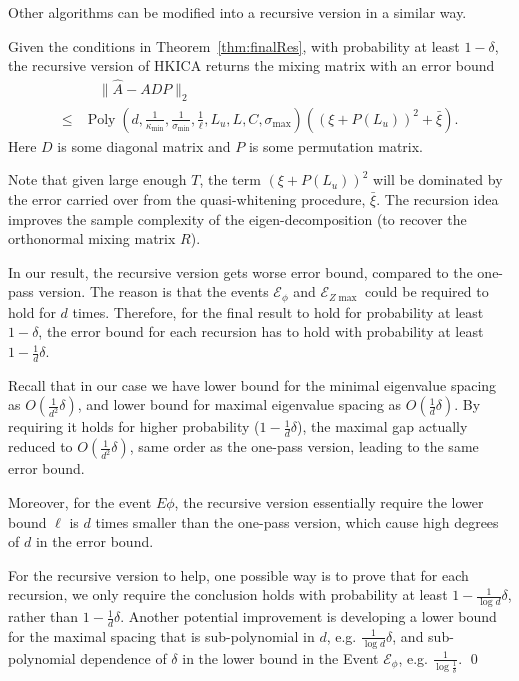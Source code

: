 \documentclass[twoside,11pt]{article}
\newcommand{\Ephi}{\mathcal{E}_{\phi}}
\newcommand{\Ez}{\mathcal{E}_{Z\max}}
\DeclareMathOperator{\pol}{Poly}
\newcommand{\poly}[1]{\pol\left(#1\right)}
\begin{document}
\begin{remark}
Other algorithms can be modified into a recursive version in a similar way. 
\end{remark}
\begin{theorem}
\label{thm:recursiveAlg}
Given the conditions in Theorem~\ref{thm:finalRes}, with probability at least $1-\delta$, the recursive version of HKICA returns the mixing matrix with an error bound
\begin{align*}
& \quad \| \hat{A} - ADP\|_2 \\
\le & \poly{d,\frac{1}{\kappa_{\min}}, \frac{1}{\sigma_{\min}}, \frac{1}{\ell}, L_u, L, C, \sigma_{\max}}((\xi + P(L_u))^2 + \bar{\xi}).
\end{align*}
Here $D$ is some diagonal matrix and $P$ is some permutation matrix.
\end{theorem} 
\begin{remark}
Note that given large enough $T$, the term $(\xi + P(L_u))^2$ will be dominated by the error carried over from the quasi-whitening procedure, $\bar{\xi}$.
The recursion idea improves the sample complexity of the eigen-decomposition (to recover the orthonormal mixing matrix $R$).  
\end{remark}

\begin{remark}
In our result, the recursive version gets worse error bound, compared to the one-pass version. The reason is that the events $\Ephi$ and $\Ez$ could be required to hold for $d$ times. Therefore, for the final result to hold for probability at least $1-\delta$, the error bound for each recursion has to hold with probability at least $1-\frac{1}{d}\delta$. 

Recall that in our case we have lower bound for the minimal eigenvalue spacing as $O(\frac{1}{d^2}\delta)$, and lower bound for maximal eigenvalue spacing as $O(\frac{1}{d}\delta)$. By requiring it holds for higher probability ($1-\frac{1}{d}\delta$), the maximal gap actually reduced to $O(\frac{1}{d^2}\delta)$, same order as the one-pass version, leading to the same error bound.

Moreover, for the event $E\phi$, the recursive version essentially require the lower bound $\ell$ is $d$ times smaller than the one-pass version, which cause high degrees of $d$ in the error bound.

For the recursive version to help, one possible way is to prove that for each recursion, we only require the conclusion holds with probability at least $1-\frac{1}{\log d}\delta$, rather than $1-\frac{1}{d}\delta$. 
Another potential improvement is developing a lower bound for the maximal spacing that is sub-polynomial in $d$, e.g. $\frac{1}{\log d}\delta$, and sub-polynomial dependence of $\delta$ in the lower bound in the Event $\Ephi$, e.g. $\frac{1}{\log \frac{1}{\delta}}$.    
\qed
\end{remark}
\fi
\end{document}
